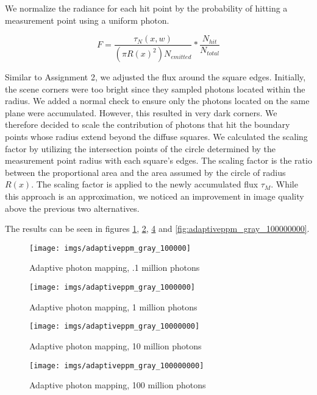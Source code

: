 We normalize the radiance for each hit point by the probability of hitting a measurement point using a uniform photon.

$$ F = \frac{\tau_{N}(x, w)}{(\pi R(x)^2) N_{emitted}}*\frac{N_{hit}}{N_{total}} $$

Similar to Assignment 2, we adjusted the flux around the square edges. Initially, the scene corners were too bright since they sampled photons located within the radius. We added a normal check to ensure only the photons located on the same plane were accumulated. However, this resulted in very dark corners. We therefore decided to scale the contribution of photons that hit the boundary points whose radius extend beyond the diffuse squares. We calculated the scaling factor by utilizing the intersection points of the circle determined by the measurement point radius with each square's edges. The scaling factor is the ratio between the proportional area and the area assumed by the circle of radius $R(x)$. The scaling factor is applied to the newly accumulated flux $\tau_M$. While this approach is an approximation, we noticed an improvement in image quality above the previous two alternatives.

The results can be seen in figures \ref{fig:adaptive_100000}, \ref{fig:adaptive_1000000}, \ref{fig:adaptive_10000000} and \ref{fig:adaptiveppm_gray_100000000}.

\begin{figure}[H]
    \centering
    \texttt{[image: imgs/adaptiveppm\_gray\_100000]}\\
    \caption{Adaptive photon mapping, .1 million photons}
    \label{fig:adaptive_100000}
\end{figure}

\begin{figure}[H]
    \centering
    \texttt{[image: imgs/adaptiveppm\_gray\_1000000]}\\
    \caption{Adaptive photon mapping, 1 million photons}
    \label{fig:adaptive_1000000}
\end{figure}

\begin{figure}[H]
    \centering
    \texttt{[image: imgs/adaptiveppm\_gray\_10000000]}\\
    \caption{Adaptive photon mapping, 10 million photons}
    \label{fig:adaptive_10000000}
\end{figure}

\begin{figure}[H]
    \centering
    \texttt{[image: imgs/adaptiveppm\_gray\_100000000]}\\
    \caption{Adaptive photon mapping, 100 million photons}
    \label{fig:adaptive_10000000}
\end{figure}
\pagebreak

